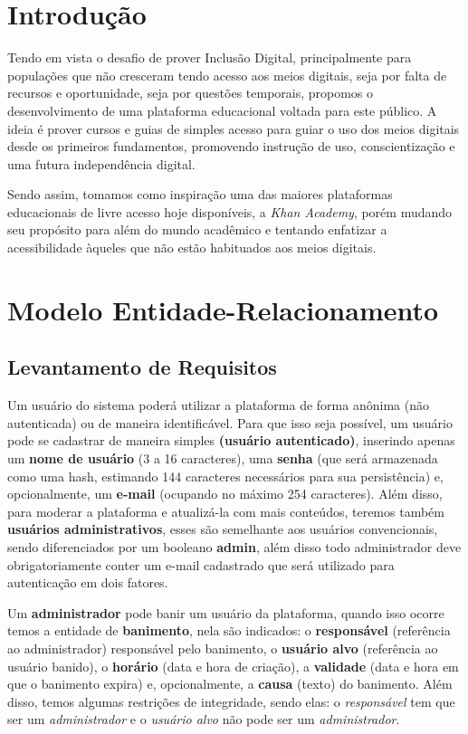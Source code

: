 \chapter{Introdução}

Tendo em vista o desafio de prover Inclusão Digital, principalmente para
populações que não cresceram tendo acesso aos meios digitais, seja por falta de
recursos e oportunidade, seja por questões temporais, propomos o
desenvolvimento de uma plataforma educacional voltada para este público. A
ideia é prover cursos e guias de simples acesso para guiar o uso dos meios
digitais desde os primeiros fundamentos, promovendo instrução de uso,
conscientização e uma futura independência digital.

Sendo assim, tomamos como inspiração uma das maiores plataformas educacionais
de livre acesso hoje disponíveis, a \textit{Khan Academy}, porém mudando seu
propósito para além do mundo acadêmico e tentando enfatizar a acessibilidade
àqueles que não estão habituados aos meios digitais.

\chapter{Modelo Entidade-Relacionamento}

\section{Levantamento de Requisitos}

Um usuário do sistema poderá utilizar a plataforma de forma anônima (não
autenticada) ou de maneira identificável. Para que isso seja possível, um
usuário pode se cadastrar de maneira simples \textbf{(usuário autenticado)},
inserindo apenas um \textbf{nome de usuário} (3 a 16 caracteres), uma
\textbf{senha} (que será armazenada como uma hash, estimando 144 caracteres
necessários para sua persistência) e, opcionalmente, um \textbf{e-mail}
(ocupando no máximo 254 caracteres). Além disso, para moderar a plataforma e
atualizá-la com mais conteúdos, teremos também \textbf{usuários
  administrativos}, esses são semelhante aos usuários convencionais, sendo
diferenciados por um booleano \textbf{admin}, além disso todo administrador
deve obrigatoriamente conter um e-mail cadastrado que será utilizado para
autenticação em dois fatores.

Um \textbf{administrador} pode banir um usuário da plataforma, quando isso
ocorre temos a entidade de \textbf{banimento}, nela são indicados: o
\textbf{responsável} (referência ao administrador) responsável pelo banimento,
o \textbf{usuário alvo} (referência ao usuário banido), o \textbf{horário}
(data e hora de criação), a \textbf{validade} (data e hora em que o banimento
expira) e, opcionalmente, a \textbf{causa} (texto) do banimento. Além disso,
temos algumas restrições de integridade, sendo elas: o \textit{responsável} tem
que ser um \textit{administrador} e o \textit{usuário alvo} não pode ser um
\textit{administrador}.

